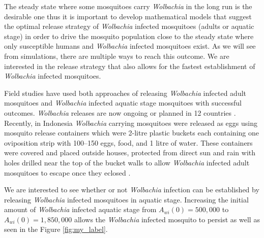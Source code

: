 \documentclass{ws-rv9x6}
\begin{document}
The steady state where some mosquitoes carry \textit{Wolbachia} in the long run is the desirable one thus %
it is important to develop mathematical models that suggest the optimal release strategy of \textit{Wolbachia} infected mosquitoes (adults or aquatic stage) in order to drive the mosquito population close to the steady state where only susceptible humans and \textit{Wolbachia} infected mosquitoes exist. As we will see from simulations, there are multiple ways to reach this outcome. We are interested in the release strategy that also allows for the fastest establishment of \textit{Wolbachia} infected mosquitoes.


Field studies have used both approaches of releasing \textit{Wolbachia} infected adult mosquitoes and \textit{Wolbachia} infected aquatic stage mosquitoes with successful outcomes. \textit{Wolbachia} releases are now ongoing or planned in 12 countries \cite{brady2020cost}. Recently, in Indonesia \textit{Wolbachia} carrying mosquitoes were released as eggs using
mosquito release containers which were 2-litre plastic buckets each containing one oviposition strip with 100–150
eggs, food, and
1 litre of water. These containers were covered and placed outside houses,
protected from direct sun and rain with holes drilled near the top of
the bucket walls to allow \textit{Wolbachia} infected adult mosquitoes to escape once they eclosed \cite{indriani2020reduced}.


We are interested to see whether or not \textit{Wolbachia} infection can be established by releasing \textit{Wolbachia} infected mosquitoes in aquatic stage.  Increasing the initial amount of \textit{Wolbachia} infected aquatic stage from $A_{wi}(0)= 500,000$ to $A_{wi}(0) = 1,850,000$ allows the \textit{Wolbachia} infected mosquito to persist as well as seen in the Figure \ref{fig:my_label}.
\end{document}
